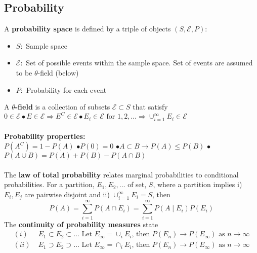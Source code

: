 \documentclass{article}
\newcommand{\blabel}{$\bullet$}
\begin{document}
\subsection{Probability}
A \textbf{probability space} is defined by a triple of objects $(S, \mathcal{E}, P)$:
\begin{itemize}
    \item $S:$ Sample space
    \item $\mathcal{E}:$ Set of possible events within the sample space. Set of events are assumed to be $\theta$-field (below)
    \item $P:$ Probability for each event
\end{itemize}
A \textbf{$\theta$-field} is a collection of subsets $\mathcal{E} \subset S$ that satisfy $0 \in \mathcal{E} \bullet E \in \mathcal{E} \Rightarrow E^C \in \mathcal{E} \bullet E_i \in \mathcal{E} \textrm{ for } 1, 2, \dots \Rightarrow \cup_{i=1}^\infty E_i \in \mathcal{E}$\\\\
\textbf{Probability properties: }\\
$P(A^C)=1 - P(A)$ \blabel $P(0)=0$ \blabel $A\subset B \longrightarrow P(A) \leq P(B)$ \blabel $P(A \cup B)=P(A)+P(B) - P(A \cap B)$\\\\
The \textbf{law of total probability} relates marginal probabilities to conditional probabilities. For a partition, {$E_1, E_2, \dots$} of set, $S$, where a partition implies i) $E_i, E_j$ are pairwise disjoint and ii) $\cup_{i=1}^\infty E_i = S$, then
\begin{equation*}
     P(A) = \sum_{i=1}^\infty P(A\cap E_i) = \sum_{i=1}^\infty P(A \mid E_i) P(E_i)
\end{equation*}
The \textbf{continuity of probability measures} state
\begin{align*}
    (i) \;& E_1 \subset E_2 \subset \dots \textrm{   Let } E_\infty = \cup_i E_i \textrm{, then } P(E_n) \longrightarrow P(E_\infty) \textrm{ as } n \longrightarrow \infty\\
    (ii) \;& E_1 \supset E_2 \supset \dots \textrm{   Let } E_\infty = \cap_i E_i \textrm{, then } P(E_n) \longrightarrow P(E_\infty) \textrm{ as } n \longrightarrow \infty\\\\
\end{align*}
\end{document}
